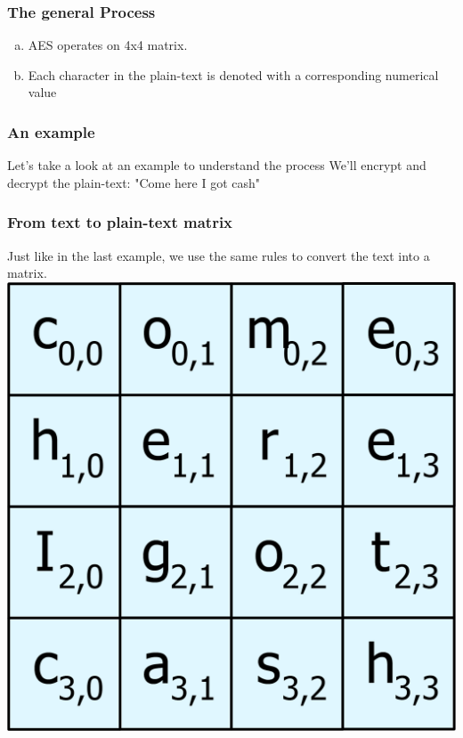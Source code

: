 \documentclass[11pt]{beamer}
\begin{document}
\begin{frame}\frametitle{The general Process}
	\begin{enumerate}[a.]
	\item AES operates on 4x4 matrix.
	\item Each character in the plain-text is denoted with a corresponding numerical value
	\end{enumerate}
\end{frame}

\begin{frame}\frametitle{An example}
\center Let's take a look at an example to understand the process
\center We'll encrypt and decrypt the plain-text:
\center "Come here I got cash"

\end{frame}

\begin{frame}\frametitle{From text to plain-text matrix}
	Just like in the last example, we use the same rules to convert the text into a matrix. 
	\center \includegraphics[scale=0.3]{initial_matrix_1.png}

\end{frame}
\end{document}
